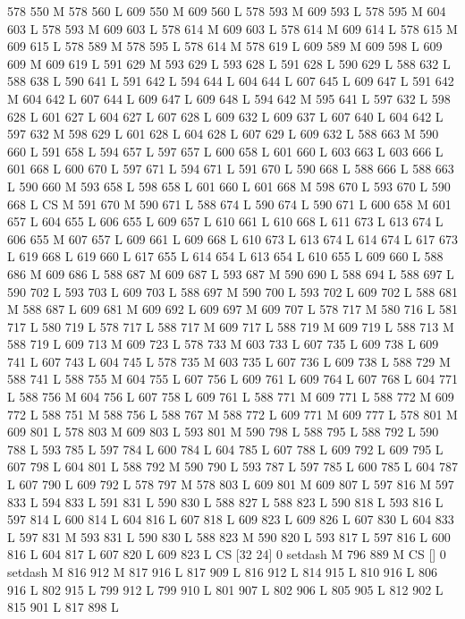{{{{{{{{{{{{{{{{{{{{{{{{578 550 M 578 560 L
609 550 M 609 560 L
578 593 M 609 593 L
578 595 M 604 603 L
578 593 M 609 603 L
578 614 M 609 603 L
578 614 M 609 614 L
578 615 M 609 615 L
578 589 M 578 595 L
578 614 M 578 619 L
609 589 M 609 598 L
609 609 M 609 619 L
591 629 M 593 629 L
593 628 L
591 628 L
590 629 L
588 632 L
588 638 L
590 641 L
591 642 L
594 644 L
604 644 L
607 645 L
609 647 L
591 642 M 604 642 L
607 644 L
609 647 L
609 648 L
594 642 M 595 641 L
597 632 L
598 628 L
601 627 L
604 627 L
607 628 L
609 632 L
609 637 L
607 640 L
604 642 L
597 632 M 598 629 L
601 628 L
604 628 L
607 629 L
609 632 L
588 663 M 590 660 L
591 658 L
594 657 L
597 657 L
600 658 L
601 660 L
603 663 L
603 666 L
601 668 L
600 670 L
597 671 L
594 671 L
591 670 L
590 668 L
588 666 L
588 663 L
590 660 M 593 658 L
598 658 L
601 660 L
601 668 M 598 670 L
593 670 L
590 668 L
CS M
591 670 M 590 671 L
588 674 L
590 674 L
590 671 L
600 658 M 601 657 L
604 655 L
606 655 L
609 657 L
610 661 L
610 668 L
611 673 L
613 674 L
606 655 M 607 657 L
609 661 L
609 668 L
610 673 L
613 674 L
614 674 L
617 673 L
619 668 L
619 660 L
617 655 L
614 654 L
613 654 L
610 655 L
609 660 L
588 686 M 609 686 L
588 687 M 609 687 L
593 687 M 590 690 L
588 694 L
588 697 L
590 702 L
593 703 L
609 703 L
588 697 M 590 700 L
593 702 L
609 702 L
588 681 M 588 687 L
609 681 M 609 692 L
609 697 M 609 707 L
578 717 M 580 716 L
581 717 L
580 719 L
578 717 L
588 717 M 609 717 L
588 719 M 609 719 L
588 713 M 588 719 L
609 713 M 609 723 L
578 733 M 603 733 L
607 735 L
609 738 L
609 741 L
607 743 L
604 745 L
578 735 M 603 735 L
607 736 L
609 738 L
588 729 M 588 741 L
588 755 M 604 755 L
607 756 L
609 761 L
609 764 L
607 768 L
604 771 L
588 756 M 604 756 L
607 758 L
609 761 L
588 771 M 609 771 L
588 772 M 609 772 L
588 751 M 588 756 L
588 767 M 588 772 L
609 771 M 609 777 L
578 801 M 609 801 L
578 803 M 609 803 L
593 801 M 590 798 L
588 795 L
588 792 L
590 788 L
593 785 L
597 784 L
600 784 L
604 785 L
607 788 L
609 792 L
609 795 L
607 798 L
604 801 L
588 792 M 590 790 L
593 787 L
597 785 L
600 785 L
604 787 L
607 790 L
609 792 L
578 797 M 578 803 L
609 801 M 609 807 L
597 816 M 597 833 L
594 833 L
591 831 L
590 830 L
588 827 L
588 823 L
590 818 L
593 816 L
597 814 L
600 814 L
604 816 L
607 818 L
609 823 L
609 826 L
607 830 L
604 833 L
597 831 M 593 831 L
590 830 L
588 823 M 590 820 L
593 817 L
597 816 L
600 816 L
604 817 L
607 820 L
609 823 L
CS [32 24] 0 setdash M
796 889 M CS [] 0 setdash M
816 912 M 817 916 L
817 909 L
816 912 L
814 915 L
810 916 L
806 916 L
802 915 L
799 912 L
799 910 L
801 907 L
802 906 L
805 905 L
812 902 L
815 901 L
817 898 L
}}}}}}}}}}}}}}}}}}}}}}}}
